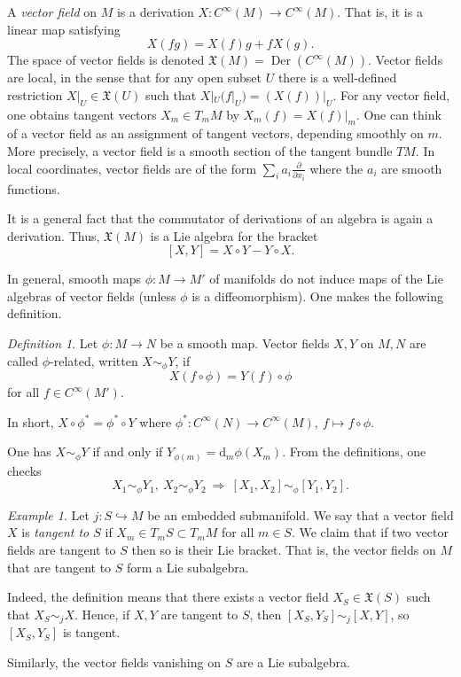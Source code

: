\documentclass{article}
\theoremstyle{remark}
\newtheorem{definition}[theorem]{Definition}
\newtheorem{example}[theorem]{Example}
\newcommand{\on}{\operatorname}
\newcommand{\hra}{\hookrightarrow}
\renewcommand{\d}{{\mbox{d}}}
\newcommand{\f}{\frac}
\newcommand{\p}{\partial}
\newcommand{\mf}{\mathfrak}
\begin{document}
A \emph{vector field} on $M$ is a derivation $X\colon C^\infty(M)\to C^\infty(M)$. That is, it is a linear map satisfying 
%
\[ X(fg)=X(f) g+f X(g).\]
%  
The space of vector fields is denoted $\mf{X}(M)=\on{Der}(C^\infty(M))$.  
Vector fields are local, in the sense that for any open subset $U$ there is 
a well-defined restriction $X|_U\in\mf{X}(U)$ such that $X|_U(f|_U)=(X(f))|_U$. 
For any vector field, one obtains tangent vectors $X_m\in T_mM$ by
$X_m(f)=X(f)|_m$. One can think of a vector field as an assignment of
tangent vectors, depending smoothly on $m$. More precisely, a vector
field is a smooth section of the tangent bundle $TM$. In local
coordinates, vector fields are of the form $\sum_i a_i \f{\p}{\p x_i}$ 
where the $a_i$ are smooth functions. 

It is a general fact that the commutator of derivations of an
algebra is again a derivation. Thus, $\mf{X}(M)$ is a Lie algebra for
the bracket
%
\[ [X,Y]=X\circ Y-Y\circ X.\]
%

In general, smooth maps $\phi\colon M\to M'$ of manifolds do not induce maps 
of the Lie algebras of vector fields (unless $\phi$ is a diffeomorphism). 
One makes the following definition. 
%
\begin{definition}
Let $\phi\colon M\to N$ be a smooth map. 
Vector fields $X,Y$ on $M,N$ are called $\phi$-related,  written 
$X\sim_\phi Y$, if 
\[ X(f\circ \phi)=Y(f)\circ \phi\]
for all $f\in C^\infty(M')$. 
\end{definition}
In short, $X\circ \phi^*=\phi^* \circ Y$ where $\phi^*\colon C^\infty(N)\to C^\infty(M),\ f\mapsto f\circ \phi$. 

One has $X\sim_\phi Y$ if and only if $Y_{\phi(m)}
=\d_m\phi (X_m)$. From the definitions, one checks 
\[ X_1\sim_\phi
Y_1,\ X_2\sim_\phi Y_2\  \Rightarrow\  [X_1,X_2]\sim_\phi[Y_1,Y_2].\] 
%
\begin{example}
Let $j\colon S\hra M$ be an embedded submanifold. We say that a vector field $X$ is \emph{tangent to $S$}  if $X_m\in T_mS\subset T_mM$ for all $m\in S$. We claim that if two vector fields are tangent to $S$ then so is their Lie bracket. 
That is, the vector fields on $M$ that are tangent to $S$ form a Lie subalgebra. 

Indeed, the definition means that there exists a vector field $X_S\in\mf{X}(S)$ such that $X_S\sim_j X$. Hence, if $X,Y$ are tangent to $S$, then 
$[X_S,Y_S]\sim_j [X,Y]$, so $[X_S,Y_S]$ is tangent. 

Similarly, the vector fields vanishing on $S$ are a Lie subalgebra. 
\end{example}
\end{document}
